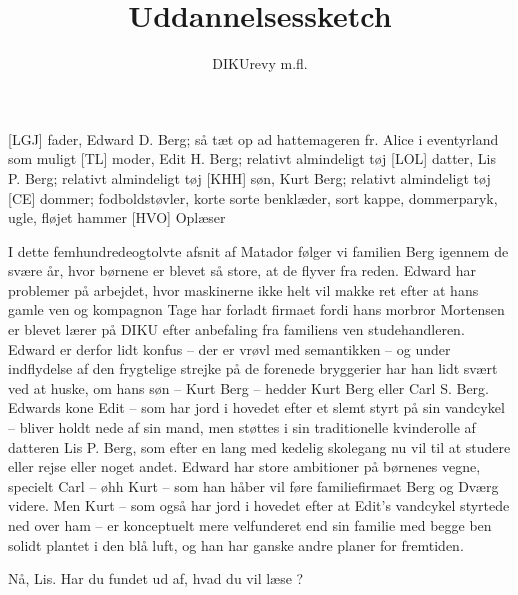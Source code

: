 \documentclass[a4paper,11pt]{article}
\title{Uddannelsessketch}
\author{DIKUrevy m.fl.}
\begin{document}
\maketitle

\begin{roles}
[LGJ] fader, Edward D. Berg; så tæt op ad hattemageren fr. Alice i 
eventyrland som muligt
[TL] moder, Edit H. Berg; relativt almindeligt tøj
[LOL] datter, Lis P. Berg; relativt almindeligt tøj
[KHH] søn, Kurt Berg; relativt almindeligt tøj
[CE] dommer; fodboldstøvler, korte sorte benklæder, sort kappe,
dommerparyk, ugle, fløjet hammer
[HVO] Oplæser
\end{roles}


\begin{sketch}



 I dette femhundredeogtolvte afsnit af Matador følger vi familien Berg
igennem de svære år, hvor børnene er blevet så store, at de flyver fra
reden. Edward har problemer på arbejdet, hvor maskinerne ikke helt vil makke ret
efter at hans gamle ven og kompagnon Tage har forladt firmaet fordi hans morbror
Mortensen er blevet lærer på DIKU efter anbefaling fra familiens ven
studehandleren. Edward er derfor lidt konfus -- der er vrøvl med semantikken --
og under indflydelse af den frygtelige strejke på de forenede bryggerier har han
lidt svært ved at huske, om hans søn -- Kurt Berg -- hedder Kurt Berg eller Carl
S. Berg. Edwards kone Edit -- som har jord i hovedet efter et slemt styrt på sin
vandcykel -- bliver holdt nede af sin mand, men støttes i sin traditionelle
kvinderolle af datteren Lis P. Berg, som efter en lang med kedelig skolegang nu
vil til at studere eller rejse eller noget andet. Edward har store ambitioner på
børnenes vegne, specielt Carl -- øhh Kurt -- som han håber vil føre
familiefirmaet Berg og Dværg videre. Men Kurt -- som også har jord i hovedet
efter at Edit's vandcykel styrtede ned over ham -- er konceptuelt mere
velfunderet end sin familie med begge ben solidt plantet i den blå luft, og han
har ganske andre planer for fremtiden.

 Nå, Lis. Har du fundet ud af, hvad du vil læse ?


\end{sketch}
\end{document}
